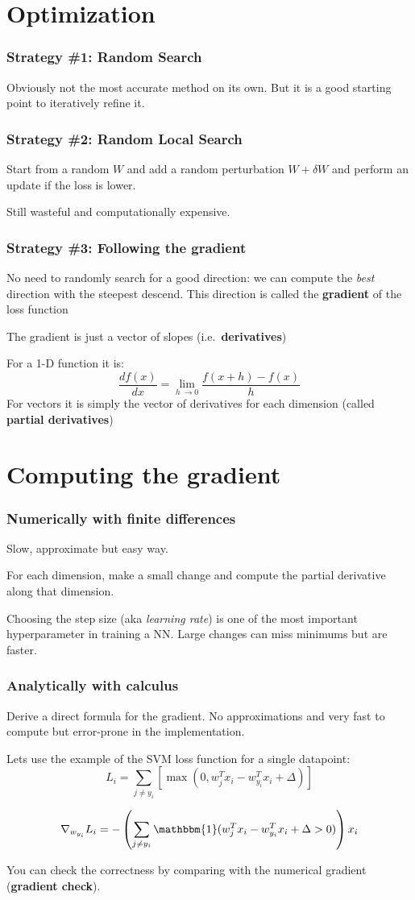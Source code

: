 \documentclass{beamer}
\begin{document}
\section{Optimization}
\begin{frame}
  \frametitle{Strategy \#1: Random Search}
  Obviously not the most accurate method on its own. But it is a good starting point to iteratively refine it.
\end{frame}

\begin{frame}
  \frametitle{Strategy \#2: Random Local Search}
  Start from a random $W$ and add a random perturbation $W + \delta W$ and perform an update if the loss is lower.

  Still wasteful and computationally expensive.
\end{frame}

\begin{frame}
  \frametitle{Strategy \#3: Following the gradient}
  No need to randomly search for a good direction: we can compute the \textit{best} direction with the steepest descend. This direction is called the \textbf{gradient} of the loss function

  The gradient is just a vector of slopes (i.e.\ \textbf{derivatives})

  For a 1-D function it is:
  \[\frac{df(x)}{dx} = \lim_{h\ \to 0} \frac{f(x + h) - f(x)}{h}\]
  For vectors it is simply the vector of derivatives for each dimension (called \textbf{partial derivatives})
\end{frame}


\section{Computing the gradient}
\begin{frame}
  \frametitle{Numerically with finite differences}
  Slow, approximate but easy way.

  For each dimension, make a small change and compute the partial derivative along that dimension.

  Choosing the step size (aka \textit{learning rate}) is one of the most important hyperparameter in training a NN. Large changes can miss minimums but are faster.
\end{frame}

\begin{frame}
  \frametitle{Analytically with calculus}
  Derive a direct formula for the gradient. No approximations and very fast to compute but error-prone in the implementation.

  Lets use the example of the SVM loss function for a single datapoint:
  \[L_i = \sum_{j\neq y_i} \left[ \max(0, w_j^Tx_i - w_{y_i}^Tx_i + \Delta) \right]\]

  \[\nabla_{w_{y_i}} L_i = - \left( \sum_{j\neq y_i} \mathbbm{1}(w_j^Tx_i - w_{y_i}^Tx_i + \Delta > 0) \right) x_i\]

   You can check the correctness by comparing with the numerical gradient (\textbf{gradient check}).
\end{frame}
\end{document}
